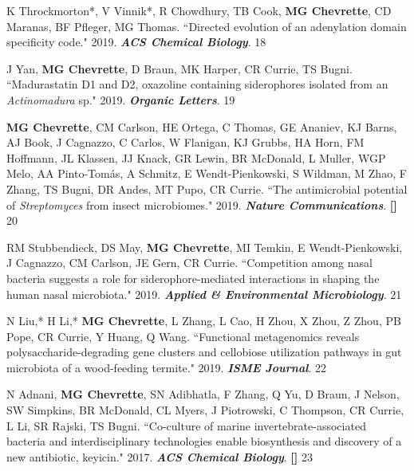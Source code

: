 \begin{cvpubs}
\cvpub
{K Throckmorton*, V Vinnik*, R Chowdhury, TB Cook, \textbf{MG Chevrette}, CD Maranas, BF Pfleger, MG Thomas. ``Directed evolution of an adenylation domain specificity code." 2019. \textit{\textbf{ACS Chemical Biology}}. \textbf{\textit{}}}
{18}

\cvpub
{J Yan, \textbf{MG Chevrette}, D Braun, MK Harper, CR Currie, TS Bugni. ``Madurastatin D1 and D2, oxazoline containing siderophores isolated from an \textit{Actinomadura} sp." 2019. \textit{\textbf{Organic Letters}}. \textbf{\textit{}}}
{19}

\cvpub
{\textbf{MG Chevrette}, CM Carlson, HE Ortega, C Thomas, GE Ananiev, KJ Barns, AJ Book, J Cagnazzo, C Carlos, W Flanigan, KJ Grubbs, HA Horn, FM Hoffmann, JL Klassen, JJ Knack, GR Lewin, BR McDonald, L Muller, WGP Melo, AA Pinto-Tom\'{a}s, A Schmitz, E Wendt-Pienkowski, S Wildman, M Zhao, F Zhang, TS Bugni, DR Andes, MT Pupo, CR Currie. ``The antimicrobial potential of \textit{Streptomyces} from insect microbiomes." 2019. \textit{\textbf{Nature Communications}}. \textbf{\textit{}} \linebreak \textbf{[\textit{}]}}
{20}

\cvpub
{RM Stubbendieck, DS May, \textbf{MG Chevrette}, MI Temkin, E Wendt-Pienkowski, J Cagnazzo, CM Carlson, JE Gern, CR Currie. ``Competition among nasal bacteria suggests a role for siderophore-mediated interactions in shaping the human nasal microbiota." 2019. \textit{\textbf{Applied \& Environmental Microbiology}}. \textbf{\textit{}}}
{21}

\cvpub
{N Liu,* H Li,* \textbf{MG Chevrette}, L Zhang, L Cao, H Zhou, X Zhou, Z Zhou, PB Pope, CR Currie, Y Huang, Q Wang. ``Functional metagenomics reveals polysaccharide-degrading gene clusters and cellobiose utilization pathways in gut microbiota of a wood-feeding termite." 2019. \textit{\textbf{ISME Journal}}. \textbf{\textit{}}}
{22}

\cvpub
{N Adnani, \textbf{MG Chevrette}, SN Adibhatla, F Zhang, Q Yu, D Braun, J Nelson, SW Simpkins, BR McDonald, CL Myers, J Piotrowski, C Thompson, CR Currie, L Li, SR Rajski, TS Bugni. ``Co-culture of marine invertebrate-associated bacteria and interdisciplinary technologies enable biosynthesis and discovery of a new antibiotic, keyicin." 2017. \textit{\textbf{ACS Chemical Biology}}.  \textbf{\textit{}} \textbf{[\textit{}]}}
{23}


\end{cvpubs}

